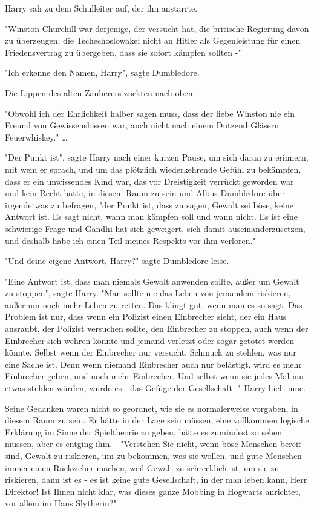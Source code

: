 {Harry sah zu dem Schulleiter auf, der ihn anstarrte.

"Winston Churchill war derjenige, der versucht hat, die britische Regierung davon zu überzeugen, die Tschechoslowakei nicht an Hitler als Gegenleistung für einen Friedensvertrag zu übergeben, dass sie sofort kämpfen sollten -"

"Ich erkenne den Namen, Harry", sagte Dumbledore.

Die Lippen des alten Zauberers zuckten nach oben.

"Obwohl ich der Ehrlichkeit halber sagen muss, dass der liebe Winston nie ein Freund von Gewissensbissen war, auch nicht nach einem Dutzend Gläsern Feuerwhiskey." …

"Der Punkt ist", sagte Harry nach einer kurzen Pause, um sich daran zu erinnern, mit wem er sprach, und um das plötzlich wiederkehrende Gefühl zu bekämpfen, dass er ein unwissendes Kind war, das vor Dreistigkeit verrückt geworden war und kein Recht hatte, in diesem Raum zu sein und Albus Dumbledore über irgendetwas zu befragen, "der Punkt ist, dass zu sagen, Gewalt sei böse, keine Antwort ist. Es sagt nicht, wann man kämpfen soll und wann nicht. Es ist eine schwierige Frage und Gandhi hat sich geweigert, sich damit auseinanderzusetzen, und deshalb habe ich einen Teil meines Respekts vor ihm verloren."

"Und deine eigene Antwort, Harry?" sagte Dumbledore leise.

"Eine Antwort ist, dass man niemals Gewalt anwenden sollte, außer um Gewalt zu stoppen", sagte Harry. "Man sollte nie das Leben von jemandem riskieren, außer um noch mehr Leben zu retten. Das klingt gut, wenn man es so sagt. Das Problem ist nur, dass wenn ein Polizist einen Einbrecher sieht, der ein Haus ausraubt, der Polizist versuchen sollte, den Einbrecher zu stoppen, auch wenn der Einbrecher sich wehren könnte und jemand verletzt oder sogar getötet werden könnte. Selbst wenn der Einbrecher nur versucht, Schmuck zu stehlen, was nur eine Sache ist. Denn wenn niemand Einbrecher auch nur belästigt, wird es mehr Einbrecher geben, und noch mehr Einbrecher. Und selbst wenn sie jedes Mal nur etwas stehlen würden, würde es - das Gefüge der Gesellschaft -" Harry hielt inne.

Seine Gedanken waren nicht so geordnet, wie sie es normalerweise vorgaben, in diesem Raum zu sein. Er hätte in der Lage sein müssen, eine vollkommen logische Erklärung im Sinne der Spieltheorie zu geben, hätte es zumindest so sehen müssen, aber es entging ihm. - "Verstehen Sie nicht, wenn böse Menschen bereit sind, Gewalt zu riskieren, um zu bekommen, was sie wollen, und gute Menschen immer einen Rückzieher machen, weil Gewalt zu schrecklich ist, um sie zu riskieren, dann ist es - es ist keine gute Gesellschaft, in der man leben kann, Herr Direktor! Ist Ihnen nicht klar, was dieses ganze Mobbing in Hogwarts anrichtet, vor allem im Haus Slytherin?"

}
